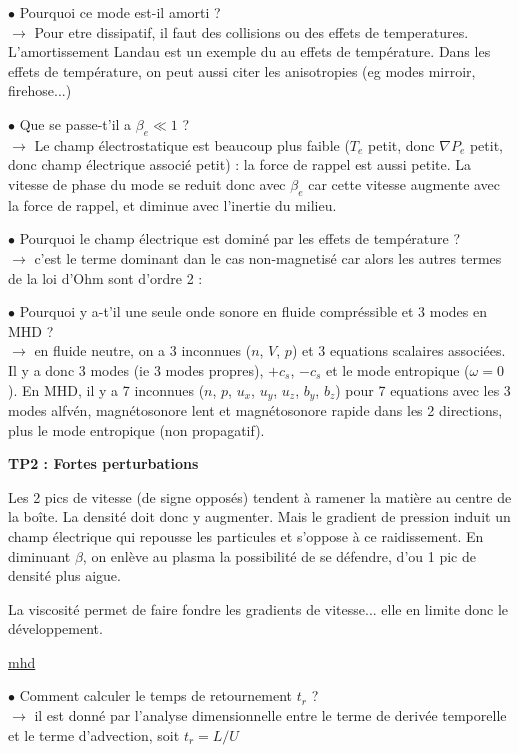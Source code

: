 \documentclass[10pt]{letter}
\begin{document}
$\bullet$ Pourquoi ce mode est-il amorti ? \\
$\rightarrow$ Pour etre dissipatif, il faut des collisions ou des effets de temperatures. L'amortissement Landau est un exemple du au effets de température. Dans les effets de température, on peut aussi citer les anisotropies (eg modes mirroir, firehose...)

$\bullet$ Que se passe-t'il a $\beta_e \ll 1$ ? \\
$\rightarrow$ Le champ électrostatique est beaucoup plus faible ($T_e$ petit, donc $\nabla P_e$ petit, donc champ électrique associé petit) : la force de rappel est aussi petite. La vitesse de phase du mode se reduit donc avec $\beta_e$ car cette vitesse augmente avec la force de rappel, et diminue avec l'inertie du milieu.

$\bullet$ Pourquoi le champ électrique est dominé par les effets de température ? \\
$\rightarrow$ c'est le terme dominant dan le cas non-magnetisé car alors les autres termes de la loi d'Ohm sont d'ordre 2 : 

$\bullet$ Pourquoi y a-t'il une seule onde sonore en fluide compréssible et 3 modes en MHD ? \\
$\rightarrow$ en fluide neutre, on a 3 inconnues ($n$, $V$, $p$) et 3 equations scalaires associées.  Il y a donc 3 modes (ie 3 modes propres), $+c_s$, $-c_s$ et le mode entropique ($\omega =0$). En MHD, il y a 7 inconnues ($n$, $p$, $u_x$, $u_y$, $u_z$, $b_y$, $b_z$) pour 7 equations avec les 3 modes alfvén, magnétosonore lent et magnétosonore rapide dans les 2 directions, plus le mode entropique (non propagatif).

\newpage

{\bf TP2 : Fortes perturbations}

\bigskip

Les 2 pics de vitesse (de signe opposés) tendent à ramener la matière au centre de la boîte. La densité doit donc y augmenter. Mais le gradient de pression induit un champ électrique qui repousse les particules et s'oppose à ce raidissement. En diminuant $\beta$, on enlève au plasma la possibilité de se défendre, d'ou 1 pic de densité plus aigue.

La viscosité permet de faire fondre les gradients de vitesse... elle en limite donc le développement.

\underline{\sc mhd}

$\bullet$ Comment calculer le temps de retournement $t_r$ ? \\
$\rightarrow$ il est donné par l'analyse dimensionnelle entre le terme de derivée temporelle et le terme d'advection, soit $t_r = L/U$
\end{document}
